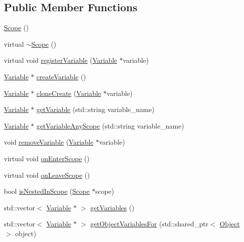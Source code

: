 \subsection*{Public Member Functions}
\begin{DoxyCompactItemize}
\item 
\hyperlink{classScope_a17c806f9852bb4454ed5709564945373}{Scope} ()
\item 
virtual \hyperlink{classScope_af19fa415c0496acf5667982b584c23d3}{$\sim$\+Scope} ()
\item 
virtual void \hyperlink{classScope_a4c2622adf1835753f5233869febd80d4}{register\+Variable} (\hyperlink{classVariable}{Variable} $\ast$variable)
\item 
\hyperlink{classVariable}{Variable} $\ast$ \hyperlink{classScope_a99112eccd8fd60ac511ed9b754268a6d}{create\+Variable} ()
\item 
\hyperlink{classVariable}{Variable} $\ast$ \hyperlink{classScope_aa723099076a40daa24e7818c6dd1c259}{clone\+Create} (\hyperlink{classVariable}{Variable} $\ast$variable)
\item 
\hyperlink{classVariable}{Variable} $\ast$ \hyperlink{classScope_a910e045176dbe71d2260bac3204e47bb}{get\+Variable} (std\+::string variable\+\_\+name)
\item 
\hyperlink{classVariable}{Variable} $\ast$ \hyperlink{classScope_aa6e0e555c44953e4c8eebaa4adba0b1a}{get\+Variable\+Any\+Scope} (std\+::string variable\+\_\+name)
\item 
void \hyperlink{classScope_a5fe1e6e8c81549eec1ff4dfca7001a69}{remove\+Variable} (\hyperlink{classVariable}{Variable} $\ast$variable)
\item 
virtual void \hyperlink{classScope_a4a42aaa7bd341ef07a90ef51860f0a8a}{on\+Enter\+Scope} ()
\item 
virtual void \hyperlink{classScope_acff92230877eb8ff60f27c86ac56e929}{on\+Leave\+Scope} ()
\item 
bool \hyperlink{classScope_a340e72ca6fa7b3b85760e8b13e75fb16}{is\+Nested\+In\+Scope} (\hyperlink{classScope}{Scope} $\ast$scope)
\item 
std\+::vector$<$ \hyperlink{classVariable}{Variable} $\ast$ $>$ \hyperlink{classScope_adb9ef772a81d2d5ce883298e43161a2d}{get\+Variables} ()
\item 
std\+::vector$<$ \hyperlink{classVariable}{Variable} $\ast$ $>$ \hyperlink{classScope_a93fdedbd4bd26e9eceb1a0e367b3785c}{get\+Object\+Variables\+For} (std\+::shared\+\_\+ptr$<$ \hyperlink{classObject}{Object} $>$ object)
\end{DoxyCompactItemize}
